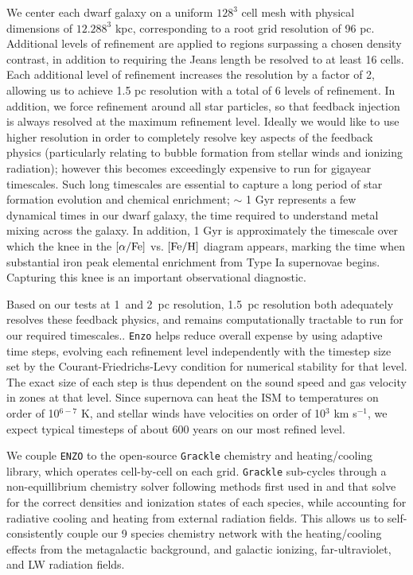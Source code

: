 \documentclass[11pt]{article}
\begin{document}
We center each dwarf galaxy on a uniform $128^3$ cell mesh with physical dimensions of   
$12.288^3$ kpc, corresponding to a root grid resolution of 96 pc. Additional levels of refinement are applied to regions surpassing a chosen density contrast, in addition to requiring the Jeans length be resolved to at least 16 cells. Each additional level of refinement increases the resolution by a factor of 2, allowing us to achieve 1.5 pc resolution with a total of 6 levels of refinement. In addition, we force refinement around all star particles, so that feedback injection is always resolved at the maximum refinement level. Ideally we would like to use higher resolution in order to completely resolve key aspects of the feedback physics (particularly relating to bubble formation from stellar winds and ionizing radiation); however this becomes exceedingly expensive to run for gigayear timescales. Such long timescales are essential to capture a long period of star formation evolution and chemical enrichment; $\sim$ 1 Gyr represents a few dynamical times in our dwarf galaxy, the time required to understand metal mixing across the galaxy. In addition, 1 Gyr is approximately the timescale over which the knee in the $\left[ \alpha / \rm{Fe}\right]$ vs. $\left[\rm{Fe}/\rm{H}\right]$ diagram appears, marking the time when substantial iron peak elemental enrichment from Type Ia supernovae begins. Capturing this knee is an important observational diagnostic.

Based on our tests at 1~and 2~pc resolution, 1.5~pc resolution both adequately resolves these feedback physics, and remains computationally tractable to run for our required timescales.. \texttt{Enzo} helps reduce overall expense by using adaptive time steps, evolving each refinement level independently with the timestep size set by the Courant-Friedrichs-Levy condition for numerical stability for that level. The exact size of each step is thus dependent on the sound speed and gas velocity in zones at that level. Since supernova can heat the ISM to temperatures on order of 10$^{6-7}$ K, and stellar winds have velocities on order of 10$^{3}$ km s$^{-1}$, we expect typical timesteps of about 600 years on our most refined level.

We couple \texttt{ENZO} to the open-source \texttt{Grackle} chemistry and heating/cooling library, which operates cell-by-cell on each grid. \texttt{Grackle} sub-cycles through a non-equillibrium chemistry solver following methods first used in \cite{Anninos1997} and \cite{Abel1997} that solve for the correct densities and ionization states of each species, while accounting for radiative cooling and heating from external radiation fields. This allows us to self-consistently couple our 9 species chemistry network with the heating/cooling effects from the metagalactic background, and galactic ionizing, far-ultraviolet, and LW radiation fields.
\end{document}
